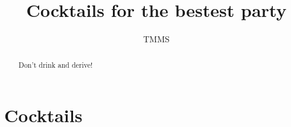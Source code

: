 \documentclass[%
a4paper,
11pt
]{scrartcl}
\begin{document}
\title{Cocktails for the bestest party}
\author{TMMS}
\maketitle

\begin{abstract}
    \noindent Don't drink and derive!
\end{abstract}

\tableofcontents

\vspace{5em}


\section{Cocktails}







\end{document}
